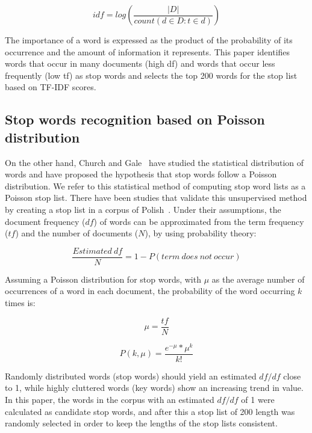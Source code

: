 \documentclass[conference]{IEEEtran}
\begin{document}
\begin{sloppy}
\begin{equation}
idf=log(\frac{|D|}{count(d\in D:t\in d)})
\end{equation}

The importance of a word is expressed as the product of the probability of its occurrence and the amount of information it represents. This paper identifies words that occur in many documents (high df) and words that occur less frequently (low tf) as stop words and selects the top 200 words for the stop list based on TF-IDF scores. 

\subsection{Stop words recognition based on Poisson distribution}

On the other hand, Church and Gale~\cite{church1995poisson} have studied the statistical distribution of words and have proposed the hypothesis that stop words follow a Poisson distribution. We refer to this statistical method of computing stop word lists as a Poisson stop list. There have been studies that validate this unsupervised method by creating a stop list in a corpus of Polish~\cite{jungiewicz2014unsupervised}. Under their assumptions, the document frequency ($df$) of words can be approximated from the term frequency ($tf$) and the number of documents ($N$), by using probability theory: 

\begin{equation}
\frac{Estimated\ df}{N}=1-P(term\ does\ not\ occur)
\end{equation}

Assuming a Poisson distribution for stop words, with $\mu$ as the average number of occurrences of a word in each document, the probability of the word occurring $k$ times is:  

\begin{equation}
\mu=\frac{tf}{N}
\end{equation}

\begin{equation}
P(k,\mu)=\frac{e^{-\mu}*\mu^k}{k!}
\end{equation}

Randomly distributed words (stop words) should yield an estimated $df/df$ close to 1, while highly cluttered words (key words) show an increasing trend in value. In this paper, the words in the corpus with an estimated $df/df$ of 1 were calculated as candidate stop words, and after this a stop list of 200 length was randomly selected in order to keep the lengths of the stop lists consistent.
 

\end{sloppy}
\end{document}
